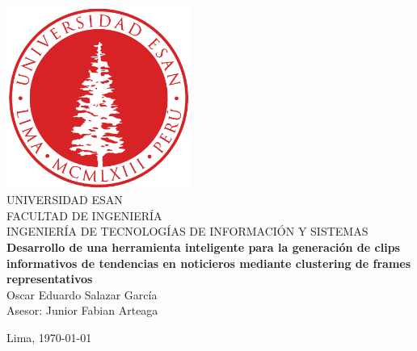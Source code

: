 \documentclass[12pt]{report}
\numberwithin{equation}{chapter} %
\begin{document}
	\begin{titlepage}
		\begin{center}
			\includegraphics[width=0.45\textwidth]{images_repo/esanlogomin}
			\vspace*{2cm} \\
			UNIVERSIDAD ESAN \vspace*{1ex} \\
			FACULTAD DE INGENIERÍA \vspace*{1ex} \\
			INGENIERÍA DE TECNOLOGÍAS DE INFORMACIÓN Y SISTEMAS\vspace*{8ex} \\
			\textbf{Desarrollo de una herramienta inteligente para la generación de clips informativos de tendencias en noticieros mediante clustering de frames representativos}
			\vspace*{8ex}\\	
			
			Oscar Eduardo Salazar García\\
			Asesor: Junior Fabian Arteaga		
			\vfill
			
			Lima, \today 
			
		\end{center}
	\end{titlepage}

	\renewcommand{\listfigurename}{Índice de Figuras}
	\renewcommand{\tablename}{Tabla}
	\renewcommand{\listtablename}{Índice de Tablas}

	\tableofcontents %


	\setcounter{secnumdepth}{3} %
	\setcounter{tocdepth}{3}    %

	\listoffigures %

	\listoftables  %

	
	
	
	

	\appendix
	\renewcommand{\appendixname}{Anexos}
	\renewcommand{\appendixtocname}{Anexos}
	\renewcommand{\appendixpagename}{Anexos}
	\clearpage
	\addappheadtotoc
	\appendixpage
	

	\printbibliography[heading=bibintoc,title={BIBLIOGRAFÍA}]
\end{document}
